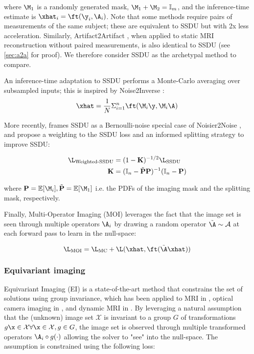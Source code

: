 where $\M_1$ is a randomly generated mask, $\M_1+\M_2=\mathbb{I}_m$, and the inference-time estimate is $\xhat_i=\ft(\y_i,\A_i)$. Note that some methods \cite{hu_spicer_2024,gan_deep_2021} require pairs of measurements of the same subject; these are equivalent to SSDU but with 2x less acceleration. Similarly, Artifact2Artifact \cite{gan_deformation-compensated_2022,liu_rare_2020}, when applied to static MRI reconstruction without paired measurements, is also identical to SSDU (see \cref{sec:a2a} for proof). We therefore consider SSDU as the archetypal method to compare.

An inference-time adaptation to SSDU performs a Monte-Carlo averaging over subsampled inputs; this is inspired by Noise2Inverse \cite{hendriksen_noise2inverse_2020}:
\begin{equation}
    \xhat=\frac{1}{N}\Sigma_{i=1}^n \ft(\M_i\y,\M_i\A)
    \label{eq:n2i}
\end{equation}

More recently, \cite{millard_theoretical_2023} frames SSDU as a Bernoulli-noise special case of Noisier2Noise \cite{moran_noisier2noise_2019}, and propose a weighting to the SSDU loss and an informed splitting strategy to improve SSDU:

\begin{align}
    \L_\text{Weighted-SSDU}&=(1-\mathbf{K})^{-1/2}\L_\text{SSDU} \\
    \mathbf{K}&=(\mathbb{I}_n-\tilde{\mathbf{P}}\mathbf{P})^{-1}(\mathbb{I}_n-\mathbf{P})
\label{eq:millard}
\end{align}

where $\mathbf{P}=\mathbb{E}[\M_i],\tilde{\mathbf{P}}=\mathbb{E}[\M_1]$ i.e. the PDFs of the imaging mask and the splitting mask, respectively.

Finally, Multi-Operator Imaging (MOI) \cite{tachella_unsupervised_2022} leverages the fact that the image set is seen through multiple operators $\A_i$ by drawing a random operator $\tilde\A\sim\mathcal{A}$ at each forward pass to learn in the null-space:

\begin{equation}
    \L_\text{MOI}=\L_\text{MC}+\L(\xhat,\ft(\tilde\A\xhat))
    \label{eq:moi}
\end{equation}

\subsubsection{Equivariant imaging}
Equivariant Imaging (EI) \cite{chen_equivariant_2021} is a state-of-the-art method that constrains the set of solutions using group invariance, which has been applied to MRI in \cite{chen_robust_2022}, optical camera imaging in \cite{wang_perspective-equivariance_2024}, and dynamic MRI in \cite{wang_fully_2024}. By leveraging a natural assumption that the (unknown) image set $\mathcal{X}$ is invariant to a group $G$ of transformations $g\x\in\mathcal{X}\forall\x\in\mathcal{X},g\in G$, the image set is observed through multiple transformed operators $\A_i\circ g(\cdot)$ allowing the solver to "see" into the null-space. The assumption is constrained using the following loss:

